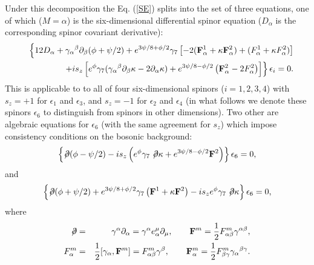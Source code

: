 \documentclass[a4paper,12pt]{article}
\begin{document}
Under this decomposition the Eq. (\ref{SE}) splits into the set of
three equations, one of which ($M=\alpha$) is the six-dimensional
differential spinor equation ($D_\alpha$ is the corresponding
spinor covariant derivative):
\begin{eqnarray}\label{3}
&& \Bigl\{ 12 D_\alpha + \gamma_\alpha{}^\beta
\partial_\beta(\phi+\psi/2) + e^{3\psi/8+\phi/2} \gamma_7 \left[
- 2({\bf F}^1_\alpha + \kappa {\bf F}^2_\alpha) + (F^1_\alpha +
\kappa F^2_\alpha) \right] \nonumber\\
&& \qquad + i s_z \left[ e^\phi \gamma_7 (\gamma_\alpha{}^\beta
\partial_\beta \kappa - 2 \partial_\alpha \kappa) +
e^{3\psi/8-\phi/2} \left( {\bf F}^2_\alpha - 2F^2_\alpha \right)
\right] \Bigr\} \, \epsilon_i = 0.
\end{eqnarray}
This is applicable to to all of four six-dimensional spinors
($i=1,2,3,4$) with $s_z=+1$ for $\epsilon_1$ and $\epsilon_3$,
and $s_z=-1$ for $\epsilon_2$ and $\epsilon_4$ (in what follows
we denote these spinors $\epsilon_6$ to distinguish from spinors
in other dimensions). Two other are algebraic equations for
$\epsilon_6$ (with the same agreement for $s_z$) which impose
consistency conditions on the bosonic background:
\begin{equation}\label{1}
\left\{ \not\!\partial (\phi-\psi/2) - i s_z \left( e^\phi
\gamma_7 \not\!\partial \kappa + e^{3\psi/8-\phi/2}{\bf F}^2
\right) \right\} \epsilon_6 = 0,
\end{equation}
and
\begin{equation}
\left\{ \not\!\partial (\phi+\psi/2) + e^{3\psi/8+\phi/2}
\gamma_7 \left( {\bf F}^1 + \kappa {\bf F}^2 \right) - i s_z
e^\phi \gamma_7 \not\!\partial \kappa \right\} \epsilon_6 = 0,
\label{2}
\end{equation}
where
\begin{eqnarray}
\not\!\partial &=& \gamma^\alpha \partial_\alpha = \gamma^\alpha
e^\mu_\alpha \partial_\mu, \qquad {\bf F}^m =
\frac12 F^m_{\alpha\beta} \gamma^{\alpha\beta}, \nonumber\\
F^m_\alpha &=& \frac12[\gamma_\alpha, {\bf F}^m] =
F^m_{\alpha\beta} \gamma^\beta, \qquad {\bf F}^m_\alpha = \frac12
F^m_{\beta\gamma} \gamma_{\alpha}{}^{\beta\gamma}.
\end{eqnarray}
\end{document}
